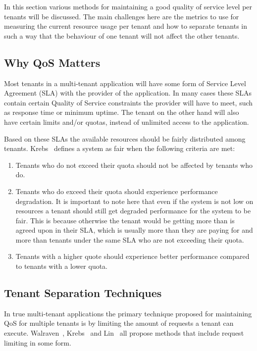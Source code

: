 In this section various methods for maintaining a good quality of service level per tenants will be discussed.
The main challenges here are the metrics to use for measuring the current resource usage per tenant and how to separate tenants in such a way that the behaviour of one tenant will not affect the other tenants.~\cite{krebs2013metrics}

\subsection{Why QoS Matters}
Most tenants in a multi-tenant application will have some form of Service Level Agreement (SLA) with the provider of the application.
In many cases these SLAs contain certain Quality of Service constraints the provider will have to meet, such as response time or minimum uptime. 
The tenant on the other hand will also have certain limits and/or quotas, instead of unlimited access to the application.

Based on these SLAs the available resources should be fairly distributed among tenants.
Krebs~\cite{krebs2013metrics} defines a system as fair when the following criteria are met:
\begin{enumerate}
	\item Tenants who do not exceed their quota should not be affected by tenants who do.
	\item Tenants who do exceed their quota should experience performance degradation. 
		It is important to note here that even if the system is not low on resources a tenant should still get degraded performance for the system to be fair.
		This is because otherwise the tenant would be getting more than is agreed upon in their SLA, which is usually more than they are paying for and more than tenants under the same SLA who are not exceeding their quota.
	\item Tenants with a higher quote should experience better performance compared to tenants with a lower quota.
\end{enumerate}

\subsection{Tenant Separation Techniques}
In true multi-tenant applications the primary technique proposed for maintaining QoS for multiple tenants is by limiting the amount of requests a tenant can execute. Walraven~\cite{walraven2012towards}, Krebs~\cite{krebs2013metrics} and Lin~\cite{lin2009feedback} all propose methods that include request limiting in some form.

